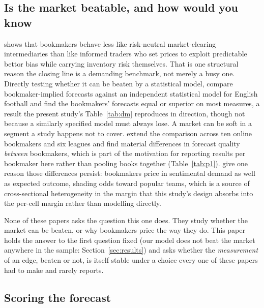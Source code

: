 \documentclass[11pt,a4paper]{article}
\begin{document}
\subsection{Is the market beatable, and how would you know}

\citet{levitt2004} shows that bookmakers behave less like risk-neutral
market-clearing intermediaries than like informed traders who set prices to
exploit predictable bettor bias while carrying inventory risk themselves.
That is one structural reason the closing line is a demanding
benchmark, not merely a busy one. Directly testing whether it can be beaten
by a statistical model, \citet{forrest2005} compare bookmaker-implied
forecasts against an independent statistical model for English football and
find the bookmakers' forecasts equal or superior on most measures, a result
the present study's Table~\ref{tab:dm} reproduces in direction, though not
because a similarly specified model must always lose. A market can be
soft in a segment a study happens not to cover. \citet{strumbelj2010} extend
the comparison across ten online bookmakers and six leagues and find
material differences in forecast quality \emph{between} bookmakers, which is
part of the motivation for reporting results per bookmaker here rather than
pooling books together (Table~\ref{tab:p1}). \citet{franck2011} give one
reason those differences persist: bookmakers price in sentimental demand as
well as expected outcome, shading odds toward popular teams, which is a
source of cross-sectional heterogeneity in the margin that this study's
design absorbs into the per-cell margin rather than modelling directly.

None of these papers asks the question this one does. They study whether the
market can be beaten, or why bookmakers price the way they do. This paper
holds the answer to the first question fixed (our model does not beat the
market anywhere in the sample: Section~\ref{sec:results}) and asks
whether the \emph{measurement} of an edge, beaten or not, is itself stable
under a choice every one of these papers had to make and rarely reports.

\subsection{Scoring the forecast}
\end{document}
